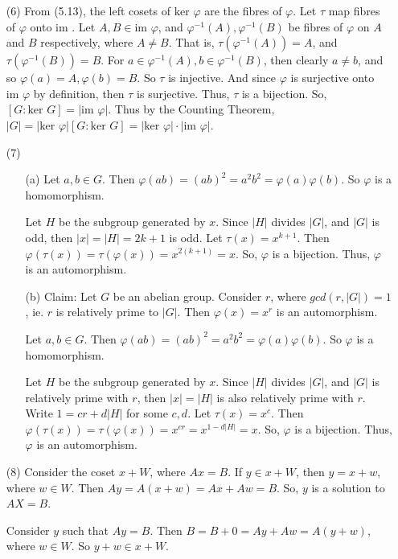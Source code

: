 \begin{itemize}
\item[(6)]
From (5.13), the left cosets of $\text{ker }\varphi$ are the fibres of $\varphi$. Let $\tau$ map fibres of $\varphi$ onto $\text{im }$. Let $A, B \in \text{im }\varphi$, and $\varphi^{-1}(A), \varphi^{-1}(B)$ be fibres of $\varphi$ on $A$ and $B$ respectively, where $A \neq B$. That is, $\tau(\varphi^{-1}(A)) = A$, and $\tau(\varphi^{-1}(B)) = B$. For $a \in \varphi^{-1}(A), b \in \varphi^{-1}(B)$, then clearly $a \neq b$, and so $\varphi(a) = A, \varphi(b) = B$. So $\tau$ is injective. And since $\varphi$ is surjective onto $\text{im }\varphi$ by definition, then $\tau$ is surjective. Thus, $\tau$ is a bijection. So, $[G: \text{ker }G] = |\text{im }\varphi|$. Thus by the Counting Theorem, $|G| = |\text{ker }\varphi|[G: \text{ker }G] = |\text{ker }\varphi| \cdot |\text{im }\varphi|$.
\item[(7)]
\begin{itemize}
\item[(a)]
Let $a, b \in G$. Then $\varphi(ab) = (ab)^2 = a^2b^2 = \varphi(a)\varphi(b)$. So $\varphi$ is a homomorphism.

Let $H$ be the subgroup generated by $x$. Since $|H|$ divides $|G|$, and $|G|$ is odd, then $|x| = |H| = 2k + 1$ is odd. Let $\tau(x) = x^{k + 1}$. Then $\varphi(\tau(x)) = \tau(\varphi(x)) = x^{2(k+1)} = x$. So, $\varphi$ is a bijection. Thus, $\varphi$ is an automorphism.
\item[(b)]
Claim: Let $G$ be an abelian group. Consider $r$, where $gcd(r, |G|) = 1$, ie. $r$ is relatively prime to $|G|$. Then $\varphi(x) = x^r$ is an automorphism.

Let $a, b \in G$. Then $\varphi(ab) = (ab)^2 = a^2b^2 = \varphi(a)\varphi(b)$. So $\varphi$ is a homomorphism.

Let $H$ be the subgroup generated by $x$. Since $|H|$ divides $|G|$, and $|G|$ is relatively prime with $r$, then $|x| = |H|$ is also relatively prime with $r$. Write $1 = cr + d|H|$ for some $c, d$. Let $\tau(x) = x^{c}$. Then $\varphi(\tau(x)) = \tau(\varphi(x)) = x^{cr} = x^{1 - d|H|} = x$. So, $\varphi$ is a bijection. Thus, $\varphi$ is an automorphism.
\end{itemize}
\item[(8)]
Consider the coset $x+W$, where $Ax = B$. If $y \in x + W$, then $y = x+w$, where $w \in W$. Then $Ay = A(x+w) = Ax + Aw = B$. So, $y$ is a solution to $AX = B$.

Consider $y$ such that $Ay = B$. Then $B = B + 0 = Ay + Aw = A(y + w)$, where $w \in W$. So $y+w \in x+W$.


\end{itemize}
